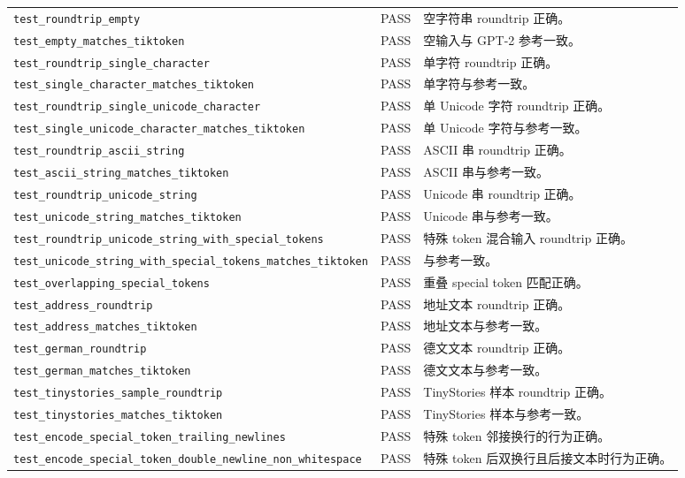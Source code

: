 \documentclass[UTF8,a4paper,11pt]{ctexart}
\begin{document}
\begin{longtable}{p{} p{} p{}}
\texttt{test\_roundtrip\_empty} & PASS & 空字符串 roundtrip 正确。 \\
\texttt{test\_empty\_matches\_tiktoken} & PASS & 空输入与 GPT-2 参考一致。 \\
\texttt{test\_roundtrip\_single\_character} & PASS & 单字符 roundtrip 正确。 \\
\texttt{test\_single\_character\_matches\_tiktoken} & PASS & 单字符与参考一致。 \\
\texttt{test\_roundtrip\_single\_unicode\_character} & PASS & 单 Unicode 字符 roundtrip 正确。 \\
\texttt{test\_single\_unicode\_character\_matches\_tiktoken} & PASS & 单 Unicode 字符与参考一致。 \\
\texttt{test\_roundtrip\_ascii\_string} & PASS & ASCII 串 roundtrip 正确。 \\
\texttt{test\_ascii\_string\_matches\_tiktoken} & PASS & ASCII 串与参考一致。 \\
\texttt{test\_roundtrip\_unicode\_string} & PASS & Unicode 串 roundtrip 正确。 \\
\texttt{test\_unicode\_string\_matches\_tiktoken} & PASS & Unicode 串与参考一致。 \\
\texttt{test\_roundtrip\_unicode\_string\_with\_special\_tokens} & PASS & 特殊 token 混合输入 roundtrip 正确。 \\
\texttt{test\_unicode\_string\_with\_special\_tokens\_matches\_tiktoken} & PASS & 与参考一致。 \\
\texttt{test\_overlapping\_special\_tokens} & PASS & 重叠 special token 匹配正确。 \\
\texttt{test\_address\_roundtrip} & PASS & 地址文本 roundtrip 正确。 \\
\texttt{test\_address\_matches\_tiktoken} & PASS & 地址文本与参考一致。 \\
\texttt{test\_german\_roundtrip} & PASS & 德文文本 roundtrip 正确。 \\
\texttt{test\_german\_matches\_tiktoken} & PASS & 德文文本与参考一致。 \\
\texttt{test\_tinystories\_sample\_roundtrip} & PASS & TinyStories 样本 roundtrip 正确。 \\
\texttt{test\_tinystories\_matches\_tiktoken} & PASS & TinyStories 样本与参考一致。 \\
\texttt{test\_encode\_special\_token\_trailing\_newlines} & PASS & 特殊 token 邻接换行的行为正确。 \\
\texttt{test\_encode\_special\_token\_double\_newline\_non\_whitespace} & PASS & 特殊 token 后双换行且后接文本时行为正确。 \\

\end{longtable}
\end{document}
